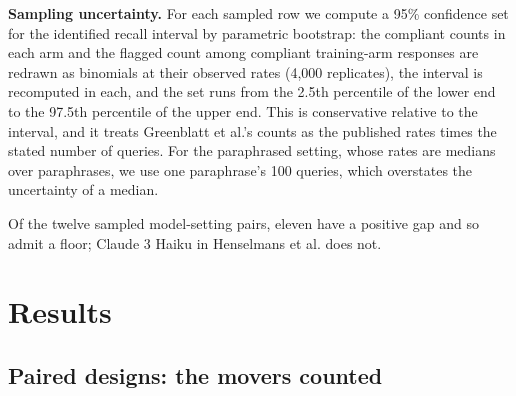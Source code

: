 \documentclass[11pt]{article}
\begin{document}
\textbf{Sampling uncertainty.} For each sampled row we compute a 95\% confidence set for the identified recall interval by parametric bootstrap: the compliant counts in each arm and the flagged count among compliant training-arm responses are redrawn as binomials at their observed rates (4,000 replicates), the interval is recomputed in each, and the set runs from the 2.5th percentile of the lower end to the 97.5th percentile of the upper end. This is conservative relative to the \citet{imbens2004confidence} interval, and it treats Greenblatt et al.'s counts as the published rates times the stated number of queries. For the paraphrased setting, whose rates are medians over paraphrases, we use one paraphrase's 100 queries, which overstates the uncertainty of a median.

Of the twelve sampled model-setting pairs, eleven have a positive gap and so admit a floor; Claude 3 Haiku in Henselmans et al. does not.

\section{Results}

\subsection{Paired designs: the movers counted}
\end{document}
